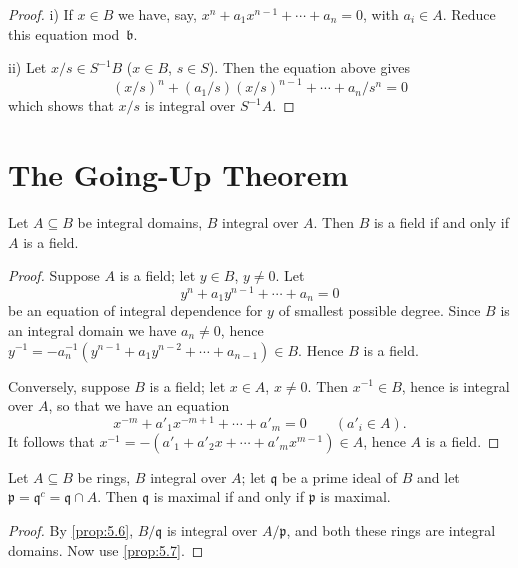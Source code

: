 \begin{proof}
i) If $x \in B$ we have, say, $x^n + a_1 x^{n-1} + \cdots + a_n = 0$, with $a_i \in A$. Reduce this equation mod~$\mathfrak{b}$.

ii) Let $x/s \in S^{-1}B$ ($x \in B$, $s \in S$). Then the equation above gives
\[
(x/s)^n + (a_1/s)(x/s)^{n-1} + \cdots + a_n/s^n = 0
\]
which shows that $x/s$ is integral over $S^{-1}A$.
\end{proof}

\section*{The Going-Up Theorem}

\begin{proposition}\label{prop:5.7}
Let $A \subseteq B$ be integral domains, $B$ integral over $A$. Then $B$ is a field if and only if $A$ is a field.
\end{proposition}

\begin{proof}
Suppose $A$ is a field; let $y \in B$, $y \neq 0$. Let
\[
y^n + a_1 y^{n-1} + \cdots + a_n = 0
\]
be an equation of integral dependence for $y$ of smallest possible degree. Since $B$ is an integral domain we have $a_n \neq 0$, hence $y^{-1} = -a_n^{-1}(y^{n-1} + a_1 y^{n-2} + \cdots + a_{n-1}) \in B$. Hence $B$ is a field.

Conversely, suppose $B$ is a field; let $x \in A$, $x \neq 0$. Then $x^{-1} \in B$, hence is integral over $A$, so that we have an equation
\[
x^{-m} + a'_1 x^{-m+1} + \cdots + a'_m = 0 \qquad (a'_i \in A).
\]
It follows that $x^{-1} = -(a'_1 + a'_2 x + \cdots + a'_m x^{m-1}) \in A$, hence $A$ is a field.
\end{proof}

\begin{corollary}\label{cor:5.8}
    Let $A \subseteq B$ be rings, $B$ integral over $A$; let $\mathfrak{q}$ be a prime ideal of $B$ and let $\mathfrak{p} = \mathfrak{q}^c = \mathfrak{q} \cap A$. Then $\mathfrak{q}$ is maximal if and only if $\mathfrak{p}$ is maximal.
\end{corollary}

\begin{proof}
    By \eqref{prop:5.6}, $B/\mathfrak{q}$ is integral over $A/\mathfrak{p}$, and both these rings are integral domains. Now use \eqref{prop:5.7}.
\end{proof}

